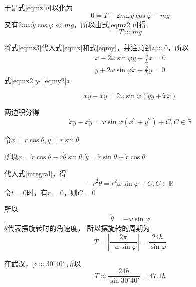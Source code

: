  于是式\ref{eqmz}可以化为
 \begin{equation}
     0=T+2m\omega\dot y\cos\varphi-mg \label{eqmz2}
 \end{equation}
 又有$2m\omega\dot y\cos\varphi \ll mg$，所以由式\ref{eqmz2}可得
 \begin{equation}
     T\approx mg \label{eqmz3}
 \end{equation}
 
 将式\ref{eqmz3}代入式\ref{eqmx}和式\ref{eqmy}，并注意到$\dot z \approx 0$，所以
 \begin{gather}
     \ddot x-2\omega\sin\varphi\dot y+\frac{g}{L}x=0 \label{eqmx2}\\
     \ddot y+2\omega\sin\varphi\dot x+\frac{g}{L}y=0 \label{eqmy2}
 \end{gather}
 式\ref{eqmx2}\times $y$- \ref{eqmy2}\times $x$ 

 \begin{equation}
     \ddot x y-x\ddot y=2\omega\sin\varphi \left(\dot y y+\dot x x \right)
 \end{equation}
 
 两边积分得
 \begin{equation}
     \dot x y-x\dot y=\omega \sin\varphi \left( x^2+y^2 \right)+C,C\in\mathbb{R} \label{integral}
 \end{equation}
 
 令$x=r\cos\theta, y=r\sin\theta$
 
 所以$\dot x=\dot r\cos\theta-r\dot \theta\sin\theta, \dot y=\dot r \sin \theta +\dot r \cos \theta$
 
 代入式\ref{integral}，得
 \begin{equation}
     -r^2\dot \theta=r^2\omega\sin\varphi +C, C\in\mathbb{R}
 \end{equation}
 令$t=0$时，有$r=0$，则$C=0$
 
 所以
 \begin{equation}
     \dot \theta=-\omega\sin\varphi
 \end{equation}
 $\dot\theta$代表摆旋转时的角速度，
 所以摆旋转的周期为
 \begin{equation}
     T=\left|\frac{2\pi}{-\omega\sin\varphi}\right|=\frac{24h}{\sin\varphi}
 \end{equation}
 
 在武汉，$\varphi \approx 30^{\circ}40'$
 所以
 \begin{equation}
     T\approx\frac{24h}{\sin 30^{\circ}40'}=47.1h
 \end{equation}

